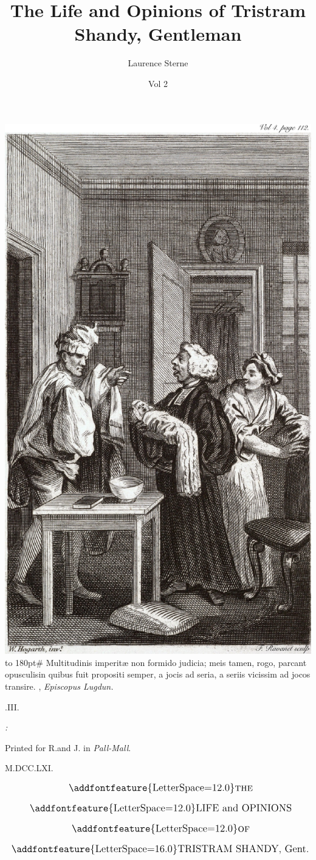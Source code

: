 \documentclass{article}
\title{The Life and Opinions of Tristram Shandy, Gentleman}
\author{Laurence Sterne}
\date{Vol 2}
\begin{document}
\pagestyle{empty}
\null\newpage
\noindent\includegraphics[width=\textwidth]{hogarth-front-3.pdf}
\newpage
\vbox{\openup 10pt}
\vfill
\vbox{\openup -3pt\halign to 180pt{\footnotesize #\cr
Multitudinis imperitæ non formido judicia; meis\cr
\quad tamen, rogo, parcant opusculis\tsh in quibus\cr
\quad fuit propositi semper, a jocis ad seria, a seriis\cr
\quad vicissim ad jocos transire.\hfill\cr
\hfill {},\cr
\hfill \textit{Episcopus Lugdun.}\cr}}
\vfill
\centerline{.\quad III.}
\vfill
\centerline{\itshape{}:}
\centerline{\smaller Printed for R.\@ and J.\@ {} in \textit{Pall-Mall}.}
\centerline{M.DCC.LXI.}
\newpage
\null
\newpage
\pagestyle{fancy}
\thispagestyle{empty}
\[\vbox{\openup 12pt\halign to \textwidth{\hss\large # \hss\cr
\addfontfeature{LetterSpace=12.0}\textsc{the}\cr
\addfontfeature{LetterSpace=12.0}LIFE and OPINIONS\cr
\addfontfeature{LetterSpace=12.0}\textsc{of}\cr
{\addfontfeature{LetterSpace=16.0}TRISTRAM SHANDY}, Gent.\cr}}\]
\end{document}
